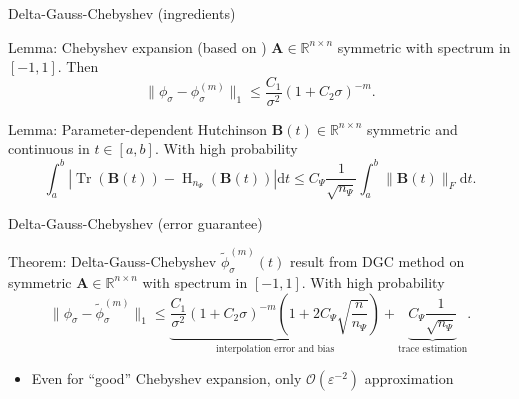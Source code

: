 \documentclass[aspectratio=169, 12pt]{beamer}
\newcommand{\mtx}[1]{\boldsymbol{#1}}
\DeclareMathOperator{\Tr}{Tr}
\DeclareMathOperator{\Hutch}{H}
\begin{document}
\begin{frame}{Delta-Gauss-Chebyshev (ingredients)}
    \begin{block}{Lemma: Chebyshev expansion (based on \cite{trefethen2008gauss})}
        $\mtx{A} \in \mathbb{R}^{n \times n}$ symmetric with spectrum
        in $[-1, 1]$. Then
        \begin{equation}
            \lVert  \phi_{\sigma} - \phi_{\sigma}^{(m)} \rVert _1 \leq \frac{C_1}{\sigma^2}(1 + C_2 \sigma)^{-m}.
        \end{equation}
    \end{block}
    \begin{block}{Lemma: Parameter-dependent Hutchinson \cite{he2023parameter}}
        $\mtx{B}(t) \in \mathbb{R}^{n \times n}$ symmetric and continuous in
        $t \in [a, b]$. With high probability
        \begin{equation}
            \int_{a}^{b} \left| \Tr(\mtx{B}(t)) - \Hutch_{n_{\Psi}}(\mtx{B}(t)) \right| \mathrm{d}t \leq C_{\Psi} \frac{1}{\sqrt{n_{\Psi}}} \int_{a}^{b} \lVert \mtx{B}(t) \rVert _F \mathrm{d}t.
        \end{equation}
    \end{block}
\end{frame}

\begin{frame}{Delta-Gauss-Chebyshev (error guarantee)}
    \begin{block}{Theorem: Delta-Gauss-Chebyshev}
        $\widetilde{\phi}_{\sigma}^{(m)}(t)$ result from \gls{DGC} method
        on symmetric $\mtx{A} \in \mathbb{R}^{n \times n}$ with spectrum in $[-1, 1]$.
        With high probability
        \begin{equation}
            \lVert \phi_{\sigma} - \widetilde{\phi}_{\sigma}^{(m)}\rVert _1
            \leq \underbrace{\frac{C_1}{\sigma^2} (1 + C_2 \sigma)^{-m} \left( 1 + 2 C_{\Psi} \sqrt{\frac{n}{n_{\Psi}}} \right)}_{\text{interpolation error and bias}} + \underbrace{C_{\Psi} \frac{1}{\sqrt{n_{\Psi}}}}_{\text{trace estimation}}.
        \end{equation}
    \end{block}
    \begin{itemize}
        \item Even for \enquote{good} Chebyshev expansion, only $\mathcal{O}(\varepsilon^{-2})$ approximation
    \end{itemize}
\end{frame}
\end{document}
